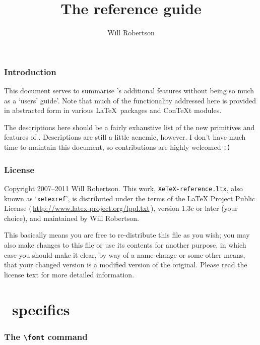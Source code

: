 \documentclass[12pt]{article}
\def\cs#1{\texttt{\textbackslash#1}}
\begin{document}
\title{The \texorpdfstring{\XeTeX}{XeTeX} reference guide}
\author{Will Robertson}
\maketitle

\vfill 

\section*{Introduction}

This document serves to summarise \XeTeX's additional features without
being so much as a `users' guide'. Note that much of the functionality
addressed here is provided in abstracted form in various \LaTeX\
packages and Con\TeX{}t modules.

The descriptions here should be a fairly exhaustive list of the new
primitives and features of \XeTeX. Descriptions are still a little
aenemic, however. I don't have much time to maintain this document, so
contributions are highly welcomed \verb|:)|

\section*{License}

Copyright 2007--2011 Will Robertson. This work,
\verb|XeTeX-reference.ltx|, also known as `\verb|xetexref|', is
distributed under the terms of the LaTeX Project Public License
\textup(\,\url{http://www.latex-project.org/lppl.txt}\,\textup), version
1.3c or later (your choice), and maintained by Will Robertson.

This basically means you are free to re-distribute this file as you
wish; you may also make changes to this file or use its contents for
another purpose, in which case you should make it clear, by way of a
name-change or some other means, that your changed version is a modified
version of the original. Please read the license text for more detailed
information.

\vfill\vfill\vfill\null

\newpage
\tableofcontents

\part{\texorpdfstring{\XeTeX}{XeTeX}\ specifics}

\section{The \cs{font} command}
\end{document}
